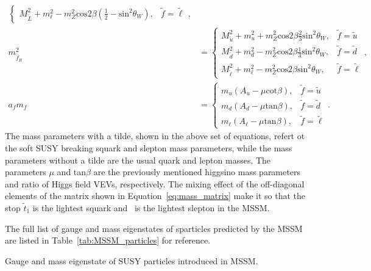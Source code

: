\begin{description}
\begin{equation}
\begin{split}
\begin{cases}
	M^2_{\tilde{L}} + m_{\ell}^2 - m_Z^2\mathrm{cos}2\beta\left(\frac{1}{2} - \mathrm{sin}^2\theta_W \right), & \tilde{f}=\tilde{\ell}
	\end{cases}, \\
	m^2_{\tilde{f}_R} &=\begin{cases}
	M^2_{\tilde{u}} + m_u^2 + m_Z^2\mathrm{cos}2\beta \frac{2}{3} \mathrm{sin}^2\theta_W, & \tilde{f}=\tilde{u}\\
	M^2_{\tilde{d}} + m_d^2 - m_Z^2\mathrm{cos}2\beta \frac{1}{3} \mathrm{sin}^2\theta_W , & \tilde{f}=\tilde{d}\\
	M^2_{\tilde{\ell}} + m_{\ell}^2 - m_Z^2\mathrm{cos}2\beta \mathrm{sin}^2\theta_W, & \tilde{f}=\tilde{\ell}
	\end{cases}, \\
	a_fm_f &=
	\begin{cases}
	m_u(A_u-\mu\mathrm{cot}\beta), & \tilde{f}=\tilde{u}\\
	m_d(A_d-\mu\mathrm{tan}\beta), & \tilde{f}=\tilde{d}\\
	m_{\ell}(A_{\ell}-\mu\mathrm{tan}\beta), & \tilde{f}=\tilde{\ell}
	\end{cases}.
	\end{split}
	\end{equation}
	The mass parameters with a tilde, shown in the above set of equations, refert ot the soft \ac{SUSY} breaking squark and slepton mass parameters, while the mass parameters without a tilde are the usual quark and lepton masses.
	The parameters $\mu$ and tan$\beta$ are the previously mentioned higgsino mass parameters and ratio of Higgs field \acp{VEV}, respectively. 
	The mixing effect of the off-diagonal elements of the matrix shown in Equation~\ref{eq:mass_matrix} make it so that the stop $\tilde{t}_1$ is the lightest squark and \stau\ is the lightest slepton in the \ac{MSSM}.
	
	\end{description}
	The full list of gauge and mass eigenstates of sparticles predicted by the \ac{MSSM} are listed in Table~\ref{tab:MSSM_particles} for reference. 
	\begin{table}[!h]
	\centering
	\caption{Gauge and mass eigenstate of \ac{SUSY} particles introduced in \ac{MSSM}.}
		
	\label{tab:MSSM_particles}
	\end{table}
	

